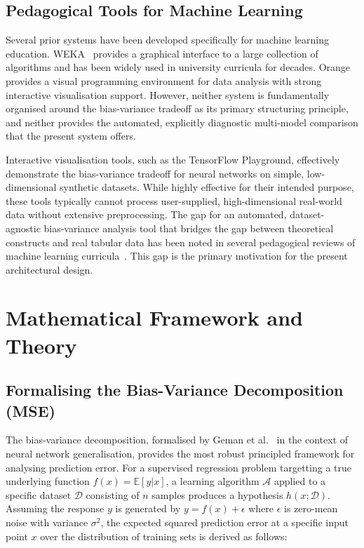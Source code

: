 \documentclass[conference]{IEEEtran}
\begin{document}
\subsection{Pedagogical Tools for Machine Learning}

Several prior systems have been developed specifically for machine learning education. WEKA~\cite{b30} provides a graphical interface to a large collection of algorithms and has been widely used in university curricula for decades. Orange~\cite{b31} provides a visual programming environment for data analysis with strong interactive visualisation support. However, neither system is fundamentally organised around the bias-variance tradeoff as its primary structuring principle, and neither provides the automated, explicitly diagnostic multi-model comparison that the present system offers.

Interactive visualisation tools, such as the TensorFlow Playground, effectively demonstrate the bias-variance tradeoff for neural networks on simple, low-dimensional synthetic datasets. While highly effective for their intended purpose, these tools typically cannot process user-supplied, high-dimensional real-world data without extensive preprocessing. The gap for an automated, dataset-agnostic bias-variance analysis tool that bridges the gap between theoretical constructs and real tabular data has been noted in several pedagogical reviews of machine learning curricula~\cite{b32}. This gap is the primary motivation for the present architectural design.

\section{Mathematical Framework and Theory}

\subsection{Formalising the Bias-Variance Decomposition (MSE)}

The bias-variance decomposition, formalised by Geman et al.~\cite{b1} in the context of neural network generalisation, provides the most robust principled framework for analysing prediction error. For a supervised regression problem targetting a true underlying function $f(x) = \mathbb{E}[y|x]$, a learning algorithm $\mathcal{A}$ applied to a specific dataset $\mathcal{D}$ consisting of $n$ samples produces a hypothesis $h(x; \mathcal{D})$. Assuming the response $y$ is generated by $y = f(x) + \epsilon$ where $\epsilon$ is zero-mean noise with variance $\sigma^2$, the expected squared prediction error at a specific input point $x$ over the distribution of training sets is derived as follows:
\end{document}
